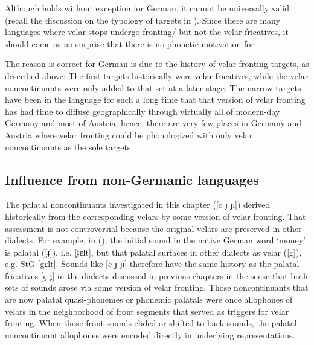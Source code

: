 Although  holds without exception for German, it cannot be universally valid (recall the discussion on the typology of  targets in ). Since there are many languages where velar stops undergo fronting/ but not the velar fricatives, it should come as no surprise that there is no phonetic motivation for .

The reason  is correct for German is due to the history of velar fronting targets, as described above: The first targets historically were velar fricatives, while the velar noncontinuants were only added to that set at a later stage. The narrow targets have been in the language for such a long time that that version of velar fronting has had time to diffuse geographically through virtually all of modern-day Germany and most of Austria; hence, there are very few places in Germany and Austria where velar fronting could be phonologized with only velar noncontinuants as the sole targets.

\subsection{Influence from non-Germanic languages}\label{sec:11.9.2}

The palatal noncontinuants investigated in this chapter ([c ɟ ɲ]) derived historically from the corresponding velars by some version of velar fronting. That assessment is not controversial because the original velars are preserved in other dialects. For example, in  (), the initial sound in the native German word ‘money’ is palatal ([ɟ]), i.e. [ɟɛlt], but that palatal surfaces in other dialects as velar ([g]), e.g. StG [gɛlt]. Sounds like [c ɟ ɲ] therefore have the same history as the palatal fricatives [ç ʝ] in the dialects discussed in previous chapters in the sense that both sets of sounds arose via some version of velar fronting. Those noncontinuants that are now palatal quasi-phonemes or phonemic palatals were once allophones of velars in the neighborhood of front segments that served as triggers for velar fronting. When those front sounds elided or shifted to back sounds, the palatal noncontinuant allophones were encoded directly in underlying representations.

